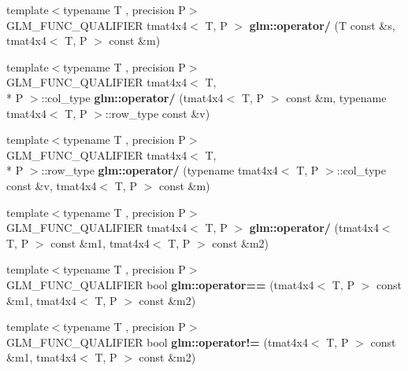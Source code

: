 \begin{DoxyCompactItemize}
\item 
\hypertarget{namespaceglm_a061e49063426cd16bad20d2916f281ca}{{\footnotesize template$<$typename T , precision P$>$ }\\G\-L\-M\-\_\-\-F\-U\-N\-C\-\_\-\-Q\-U\-A\-L\-I\-F\-I\-E\-R tmat4x4$<$ T, P $>$ {\bfseries glm\-::operator/} (T const \&s, tmat4x4$<$ T, P $>$ const \&m)}\label{namespaceglm_a061e49063426cd16bad20d2916f281ca}

\item 
\hypertarget{namespaceglm_ac86c24a679ceb1c0588e0cd9fa31df3d}{{\footnotesize template$<$typename T , precision P$>$ }\\G\-L\-M\-\_\-\-F\-U\-N\-C\-\_\-\-Q\-U\-A\-L\-I\-F\-I\-E\-R tmat4x4$<$ T, \\*
P $>$\-::col\-\_\-type {\bfseries glm\-::operator/} (tmat4x4$<$ T, P $>$ const \&m, typename tmat4x4$<$ T, P $>$\-::row\-\_\-type const \&v)}\label{namespaceglm_ac86c24a679ceb1c0588e0cd9fa31df3d}

\item 
\hypertarget{namespaceglm_af41edbb529eca615b9f65e625fae2bab}{{\footnotesize template$<$typename T , precision P$>$ }\\G\-L\-M\-\_\-\-F\-U\-N\-C\-\_\-\-Q\-U\-A\-L\-I\-F\-I\-E\-R tmat4x4$<$ T, \\*
P $>$\-::row\-\_\-type {\bfseries glm\-::operator/} (typename tmat4x4$<$ T, P $>$\-::col\-\_\-type const \&v, tmat4x4$<$ T, P $>$ const \&m)}\label{namespaceglm_af41edbb529eca615b9f65e625fae2bab}

\item 
\hypertarget{namespaceglm_a53cc97cdb468d042fd35bfd46d35fbc0}{{\footnotesize template$<$typename T , precision P$>$ }\\G\-L\-M\-\_\-\-F\-U\-N\-C\-\_\-\-Q\-U\-A\-L\-I\-F\-I\-E\-R tmat4x4$<$ T, P $>$ {\bfseries glm\-::operator/} (tmat4x4$<$ T, P $>$ const \&m1, tmat4x4$<$ T, P $>$ const \&m2)}\label{namespaceglm_a53cc97cdb468d042fd35bfd46d35fbc0}

\item 
\hypertarget{namespaceglm_a4a5a52bd72d27f2659923dcac3a41bd9}{{\footnotesize template$<$typename T , precision P$>$ }\\G\-L\-M\-\_\-\-F\-U\-N\-C\-\_\-\-Q\-U\-A\-L\-I\-F\-I\-E\-R bool {\bfseries glm\-::operator==} (tmat4x4$<$ T, P $>$ const \&m1, tmat4x4$<$ T, P $>$ const \&m2)}\label{namespaceglm_a4a5a52bd72d27f2659923dcac3a41bd9}

\item 
\hypertarget{namespaceglm_a4f307dd12855db67708f7198042f419e}{{\footnotesize template$<$typename T , precision P$>$ }\\G\-L\-M\-\_\-\-F\-U\-N\-C\-\_\-\-Q\-U\-A\-L\-I\-F\-I\-E\-R bool {\bfseries glm\-::operator!=} (tmat4x4$<$ T, P $>$ const \&m1, tmat4x4$<$ T, P $>$ const \&m2)}\label{namespaceglm_a4f307dd12855db67708f7198042f419e}

\end{DoxyCompactItemize}


